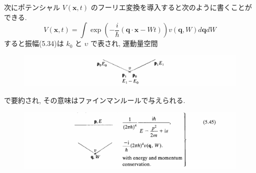 \documentclass[a4paper,12pt]{article}
\begin{document}
次にポテンシャル $V(\mathbf{x}, t)$ のフーリエ変換を導入すると次のように書くことができる.
\begin{equation*}
    V(\mathbf{x}, t) = \int \exp \left( - \frac{i}{\hbar} (\mathbf{q} \cdot \mathbf{x} - Wt) \right) v(\mathbf{q}, W) d\mathbf{q} dW \tag{5.44}
\end{equation*}
すると振幅(5.34)は $k_0$ と $\upsilon$ で表され, 運動量空間
\begin{figure}[H]
    \centering
    \includegraphics[width=\textwidth]{figure/figB5-45.png}
\end{figure}
で要約され, その意味はファインマンルールで与えられる.
\begin{figure}[H]
    \centering
    \includegraphics[width=\textwidth]{figure/eq5-45.png}
\end{figure}
\end{document}
